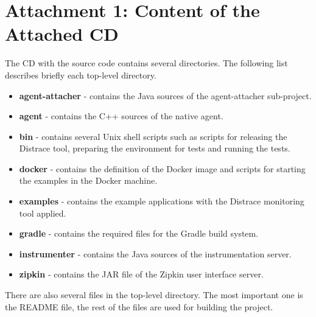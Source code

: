 \chapter*{Attachment 1: Content of the Attached CD}
The CD with the source code contains several directories. The following list describes briefly each top-level directory.
\begin{itemize}
	\item \textbf{agent-attacher} - contains the Java sources of the agent-attacher sub-project.
	\item \textbf{agent} - contains the C++ sources of the native agent.
	\item \textbf{bin} - contains several Unix shell scripts such as scripts for releasing the Distrace tool, preparing the environment for tests and running the tests.
	\item \textbf{docker} - contains the definition of the Docker image and scripts for starting the examples in the Docker machine.
	\item \textbf{examples} - contains the example applications with the Distrace monitoring tool applied.
	\item \textbf{gradle} - contains the required files for the Gradle build system.
	\item \textbf{instrumenter} - contains the Java sources of the instrumentation server.
	\item \textbf{zipkin} - contains the JAR file of the Zipkin user interface server.
\end{itemize}
 There are also several files in the top-level directory. The most important one is the README file, the rest of the files are used for building the project.